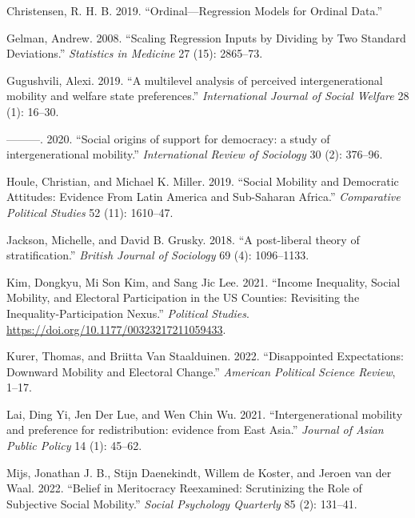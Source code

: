 \documentclass[
  11pt,
]{article}
\newlength{\cslhangindent}
\newenvironment{CSLReferences}[2] %
 {%
  \setlength{\parindent}{0pt}
  \ifodd #1 \everypar{\setlength{\hangindent}{\cslhangindent}}\ignorespaces\fi
  \ifnum #2 > 0
  \setlength{\parskip}{#2\baselineskip}
  \fi
 }%
 {}
\begin{document}
\hypertarget{refs}{}
\begin{CSLReferences}{1}{0}
\leavevmode{}%
Christensen, R. H. B. 2019. {``Ordinal---Regression Models for Ordinal
Data.''}

\leavevmode{}%
Gelman, Andrew. 2008. {``Scaling Regression Inputs by Dividing by Two
Standard Deviations.''} \emph{Statistics in Medicine} 27 (15): 2865--73.

\leavevmode{}%
Gugushvili, Alexi. 2019. {``{A multilevel analysis of perceived
intergenerational mobility and welfare state preferences}.''}
\emph{International Journal of Social Welfare} 28 (1): 16--30.

\leavevmode{}%
---------. 2020. {``{Social origins of support for democracy: a study of
intergenerational mobility}.''} \emph{International Review of Sociology}
30 (2): 376--96.

\leavevmode{}%
Houle, Christian, and Michael K. Miller. 2019. {``{Social Mobility and
Democratic Attitudes: Evidence From Latin America and Sub-Saharan
Africa}.''} \emph{Comparative Political Studies} 52 (11): 1610--47.

\leavevmode{}%
Jackson, Michelle, and David B. Grusky. 2018. {``{A post-liberal theory
of stratification}.''} \emph{British Journal of Sociology} 69 (4):
1096--1133.

\leavevmode{}%
Kim, Dongkyu, Mi Son Kim, and Sang Jic Lee. 2021. {``{Income Inequality,
Social Mobility, and Electoral Participation in the US Counties:
Revisiting the Inequality-Participation Nexus}.''} \emph{Political
Studies}. \url{https://doi.org/10.1177/00323217211059433}.

\leavevmode{}%
Kurer, Thomas, and Briitta Van Staalduinen. 2022. {``{Disappointed
Expectations: Downward Mobility and Electoral Change}.''} \emph{American
Political Science Review}, 1--17.

\leavevmode{}%
Lai, Ding Yi, Jen Der Lue, and Wen Chin Wu. 2021. {``{Intergenerational
mobility and preference for redistribution: evidence from East Asia}.''}
\emph{Journal of Asian Public Policy} 14 (1): 45--62.

\leavevmode{}%
Mijs, Jonathan J. B., Stijn Daenekindt, Willem de Koster, and Jeroen van
der Waal. 2022. {``{Belief in Meritocracy Reexamined: Scrutinizing the
Role of Subjective Social Mobility}.''} \emph{Social Psychology
Quarterly} 85 (2): 131--41.


\end{CSLReferences}
\end{document}
